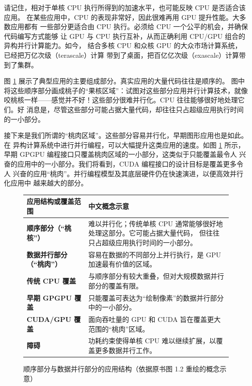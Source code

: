 请记住，相对于单核 CPU 执行所得到的加速水平，也可能反映 CPU 是否适合该应用。
在某些应用中，CPU 的表现非常好，因此很难再用 GPU 提升性能。大多数应用都有
一些部分更适合由 CPU 执行。必须给 CPU 一个公平的机会，并确保代码编写方式能够
让 GPU 与 CPU 执行互补，从而正确利用 CPU/GPU 组合的异构并行计算能力。如今，
结合多核 CPU 和众核 GPU 的大众市场计算系统，已经把万亿次级（terascale）计算
带到了桌面，把百亿亿次级（exascale）计算带到了集群。

图 \ref{fig:1-2} 展示了典型应用的主要组成部分。真实应用的大量代码往往是顺序的。
图中将这些顺序部分画成桃子的“果核区域”：试图对这些部分应用并行计算技术，就像
咬桃核一样——感觉并不好！这些部分很难并行化。CPU 往往能够很好地处理它们。好
消息是，尽管这些部分可能占据大量代码，却往往只占超级应用执行时间的一小部分。

接下来是我们所谓的“桃肉区域”。这些部分容易并行化，早期图形应用也是如此。在
异构计算系统中进行并行编程，可以大幅提升这类应用的速度。如图 \ref{fig:1-2}
所示，早期 GPGPU 编程接口只覆盖桃肉区域的一小部分，这类似于只能覆盖最令人
兴奋的应用中的一小部分。我们将看到，CUDA 编程接口的设计目标是覆盖更多令人
兴奋的应用“桃肉”。并行编程模型及其底层硬件仍在快速演进，以便高效并行化应用中
越来越大的部分。

\begin{figure}[htbp]
  \centering
  \small
  \renewcommand{\arraystretch}{1.35}
  \begin{tabularx}{0.95\textwidth}{%
    >{\raggedright\arraybackslash\bfseries}p{}
    >{\raggedright\arraybackslash}X}
    \toprule
    应用结构或覆盖范围 & 中文概念示意 \\
    \midrule
    顺序部分（“桃核”）
      & 难以并行化；传统单核 CPU 通常能够很好地处理这部分。它可能占据大量代码，
        但往往只占超级应用执行时间的一小部分。 \\
    数据并行部分（“桃肉”）
      & 容易在数据的不同部分上并行执行，是 GPU 加速最有价值的区域。 \\
    传统 CPU 覆盖
      & 与顺序部分有较大重叠，但对大规模数据并行部分的覆盖有限。 \\
    早期 GPGPU 覆盖
      & 只能覆盖可表达为“绘制像素”的数据并行部分中的一小部分。 \\
    CUDA/GPU 覆盖
      & 面向吞吐量的 GPU 和 CUDA 旨在覆盖更大范围的“桃肉”区域。 \\
    障碍
      & 功耗约束使得单核 CPU 难以继续扩展，以覆盖更多数据并行工作。 \\
    \bottomrule
  \end{tabularx}
  \caption{顺序部分与数据并行部分的应用结构（依据原书图 1.2 重绘的概念示意）}
  \label{fig:1-2}
\end{figure}

